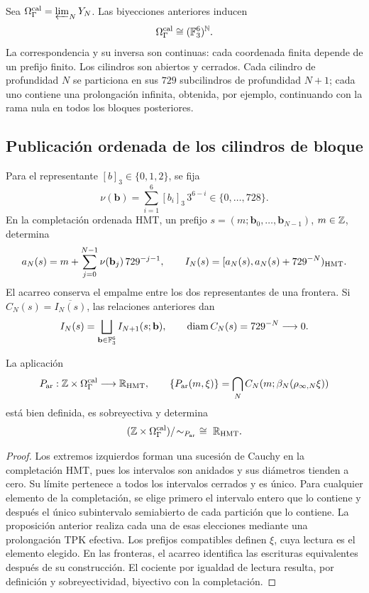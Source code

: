Sea \(\Omega_{\Gamma}^{\rm cal}=\varprojlim_NY_N\). Las biyecciones
anteriores inducen
\[
 \Omega_{\Gamma}^{\rm cal}\cong(\mathbb F_3^6)^{\mathbb N}.
\]
La correspondencia y su inversa son continuas: cada coordenada finita
depende de un prefijo finito. Los cilindros son abiertos y cerrados.
Cada cilindro de profundidad \(N\) se particiona en sus \(729\)
subcilindros de profundidad \(N+1\); cada uno contiene una prolongación
infinita, obtenida, por ejemplo, continuando con la rama nula en todos
los bloques posteriores.



\subsection{Publicación ordenada de los cilindros de bloque}
\label{hmtfg:publicacion-cilindros-bloque}

Para el representante \([b]_3\in\{0,1,2\}\), se fija
\[
 \nu(\mathbf b)=\sum_{i=1}^6[b_i]_3\,3^{6-i}\in\{0,\ldots,728\}.
\]
En la completación ordenada HMT, un prefijo
\(s=(m;\mathbf b_0,\ldots,\mathbf b_{N-1})\), \(m\in\mathbb Z\), determina
\[
 a_N(s)=m+\sum_{j=0}^{N-1}\nu(\mathbf b_j)\,729^{-j-1},\qquad
 I_N(s)=[a_N(s),a_N(s)+729^{-N})_{\rm HMT}.
\]
El acarreo conserva el empalme entre los dos representantes de una
frontera. Si \(C_N(s)=\overline{I_N(s)}\), las relaciones anteriores dan
\[
 I_N(s)=\bigsqcup_{\mathbf b\in\mathbb F_3^6}I_{N+1}(s;\mathbf b),
 \qquad \operatorname{diam}C_N(s)=729^{-N}\longrightarrow0.
\]

\begin{proposition}
\label{hmtfg:cobertura-arquimediana}
La aplicación
\[
 P_{\rm ar}:\mathbb Z\times\Omega_\Gamma^{\rm cal}
       \longrightarrow\mathbb R_{\rm HMT},\qquad
 \{P_{\rm ar}(m,\xi)\}
    =\bigcap_N C_N(m;\beta_N(\rho_{\infty,N}\xi))
\]
está bien definida, es sobreyectiva y determina
\[
 (\mathbb Z\times\Omega_\Gamma^{\rm cal})/\!\sim_{P_{\rm ar}}
       \ \cong\ \mathbb R_{\rm HMT}.
\]
\end{proposition}
\begin{proof}
Los extremos izquierdos forman una sucesión de Cauchy en la completación
HMT, pues los intervalos son anidados y sus diámetros tienden a cero.
Su límite pertenece a todos los intervalos cerrados y es único.
Para cualquier elemento de la completación, se elige primero el intervalo
entero que lo contiene y después el único subintervalo semiabierto de
cada partición que lo contiene. La proposición anterior realiza cada
una de esas elecciones mediante una prolongación TPK efectiva.
Los prefijos compatibles definen \(\xi\), cuya lectura es el elemento
elegido. En las fronteras, el acarreo identifica las escrituras
equivalentes después de su construcción. El cociente por igualdad
de lectura resulta, por definición y sobreyectividad, biyectivo con
la completación.
\end{proof}

